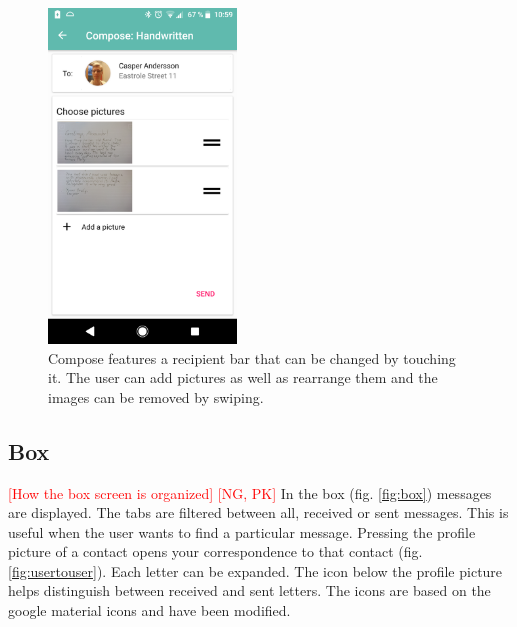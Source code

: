 \documentclass[acmlarge, review=false, screen=true]{acmart}
\begin{document}
      \begin{figure}
        \includegraphics[width=5cm]{images/composepicagain.png}
        \caption{Compose features a recipient bar that can be changed by touching it. The user can add pictures as well as rearrange them and the images can be removed by swiping.}
        \label{fig:compose}
      \end{figure}

    \subsection{Box}
      \textcolor{red}{[How the box screen is organized] [NG, PK]} \newline
      In the box (fig. \ref{fig:box}) messages are displayed. The tabs are filtered between all, received or sent messages. This is useful when the user wants to find a particular message. Pressing the profile picture of a contact opens your correspondence to that contact (fig. \ref{fig:usertouser}). Each letter can be expanded. The icon below the profile picture helps distinguish between received and sent letters. The icons are based on the google material icons\cite{materialicons} and have been modified.
\end{document}
